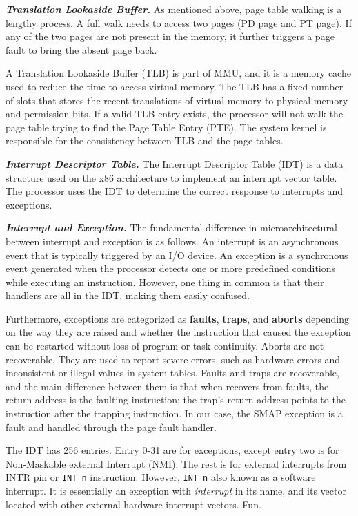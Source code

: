\textbf{\textit{Translation Lookaside Buffer.}} As mentioned above, page table walking is a lengthy process. A full walk needs to access two pages (PD page and PT page). If any of the two pages are not present in the memory, it further triggers a page fault to bring the absent page back.

A Translation Lookaside Buffer (TLB) is part of MMU, and it is a memory cache used to reduce the time to access virtual memory. The TLB has a fixed number of slots that stores the recent translations of virtual memory to physical memory and permission bits. If a valid TLB entry exists, the processor will not walk the page table trying to find the Page Table Entry (PTE). The system kernel is responsible for the consistency between TLB and the page tables.


\textbf{\textit{Interrupt Descriptor Table.}} The Interrupt Descriptor Table (IDT) is a data structure used on the x86 architecture to implement an interrupt vector table. The processor uses the IDT to determine the correct response to interrupts and exceptions.



\textbf{\textit{Interrupt and Exception.}} The fundamental difference in microarchitectural between interrupt and exception is as follows.  An interrupt is an asynchronous event that is typically triggered by an I/O device. An exception is a synchronous event generated when the processor detects one or more predefined conditions while executing an instruction. However, one thing in common is that their handlers are all in the IDT, making them easily confused.

Furthermore, exceptions are categorized as \textbf{faults}, \textbf{traps}, and \textbf{aborts} depending on the way they are raised and whether the instruction that caused the exception can be restarted without loss of program or task continuity. Aborts are not recoverable. They are used to report severe errors, such as hardware errors and inconsistent or illegal values in system tables. Faults and traps are recoverable, and the main difference between them is that when recovers from faults, the return address is the faulting instruction; the trap's return address points to the instruction after the trapping instruction. In our case, the SMAP exception is a fault and handled through the page fault handler.

The IDT has 256 entries. Entry 0-31 are for exceptions, except entry two is for Non-Maskable external Interrupt (NMI). The rest is for external interrupts from INTR pin or \texttt{INT n} instruction. However, \texttt{INT n} also known as a software interrupt. It is essentially an exception with \textit{interrupt} in its name, and its vector located with other external hardware interrupt vectors. Fun.



